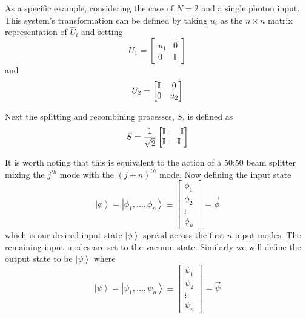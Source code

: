 \documentclass[aps,pra,twocolumn,superscriptaddress,numerical]{revtex4-1}
\begin{document}
As a specific example, considering the case of $N=2$ and a single photon input. This system's transformation can be defined by taking $u_{i}$ as the $n\times n$ matrix representation of $\hat{U}_{i}$ and setting 
\begin{equation}
	U_{1} = \begin{bmatrix} 
		u_{1} & 0         \\
		0 & \mathbb{I}
	   	\end{bmatrix}
\end{equation}
and
\begin{equation}
U_{2}=
	\begin{bmatrix}
	\mbox{\ensuremath{\mathbb{I}}} & 0\\
	0 & u_{2}
	\end{bmatrix}
\end{equation}

Next the splitting and recombining processes, $S$, is defined as
\begin{equation}
	S=\frac{1}{\sqrt{2}}
	\begin{bmatrix}
		\mbox{\ensuremath{\mathbb{I}}} & \ensuremath{-\mathbb{I}}\\
		\ensuremath{\mathbb{I}} & \ensuremath{\mathbb{I}}
	\end{bmatrix}
\end{equation}

It is worth noting that this is equivalent to the action of a 50:50 beam splitter mixing the $j^{th}$ mode with the $\left(j+n\right)^{th}$ mode. Now defining the input state
\begin{equation}
	\left|\phi\right\rangle =\left|\phi_{1},...,\phi_{n}\right\rangle \equiv
	\begin{bmatrix}\phi_{1}\\
			\phi_{2}\\
			\vdots\\
			\phi_{n}
	\end{bmatrix}=\vec{\phi}
\end{equation}
which is our desired input state $\left|\phi\right\rangle $ spread across the first $n$ input modes. The remaining input modes are set to the vacuum state. Similarly we will define the output state to be $\left|\psi\right\rangle $ where
\begin{equation}
	\left|\psi\right\rangle = \left|\psi_{1},...,\psi_{n}\right\rangle \equiv\begin{bmatrix}\psi_{1}\\
		\psi_{2}\\
		\vdots\\
		\psi_{n}
		\end{bmatrix}=\vec{\psi}
\end{equation}
\end{document}
